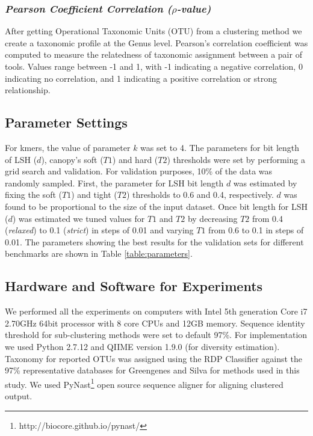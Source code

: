 \documentclass[10pt, conference, compsocconf]{IEEEtran}
\begin{document}
\subsubsection{\textit{Pearson Coefficient Correlation ($\rho$-value)}}
After getting Operational Taxonomic Units (OTU) from a clustering method we create a taxonomic profile at the Genus level. Pearson’s correlation coefficient was computed to measure the relatedness of taxonomic assignment between a pair of tools. Values range between -1 and 1, with -1 indicating a negative correlation, 0 indicating no correlation, and 1 indicating a positive correlation or strong relationship.

\subsection{\textbf{Parameter Settings}}
For kmers, the value of parameter $k$ was set to 4. The parameters for bit length of LSH ($d$), 
canopy's soft ($T1$) and 
hard ($T2$) thresholds were set by performing a grid search and validation. For validation purposes, 10\%  of the 
data was randomly sampled. First, the parameter for LSH 
bit length $d$ was estimated by fixing 
the soft ($T1$) and tight ($T2$) thresholds 
to 0.6 and 0.4, respectively.  $d$ was found to be proportional to the 
size of the input dataset. 
%
Once bit length for 
LSH  ($d$) was estimated we tuned values for $T1$ and $T2$ by decreasing $T2$ from 0.4 (\emph{relaxed}) to 0.1 (\emph{strict}) in steps of 0.01 and varying 
$T1$ from 0.6 to 0.1 in steps of 0.01. The parameters showing the best results for the validation sets for different benchmarks are 
shown in Table \ref{table:parameters}.


    

\subsection{\textbf{Hardware and Software for Experiments}}
We performed all the experiments on computers with Intel 5th generation Core i7 2.70GHz 64bit processor with 8 core CPUs and 
12GB memory. Sequence identity threshold for  
sub-clustering methods were set to default 97\%. For implementation we 
used Python 2.7.12 and QIIME \cite{MARQiime} version 1.9.0 (for diversity estimation).  Taxonomy for reported OTUs was assigned 
using the RDP Classifier \cite{MARRdp} against the 97\% representative databases for Greengenes \cite{MARGreen1} and Silva \cite{MARSilva} 
for methods used in this study. We used PyNast\footnote{http://biocore.github.io/pynast/} open source sequence aligner
  for aligning clustered output. 
\end{document}
